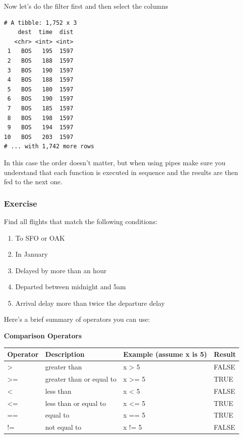 \documentclass[]{article}
\newenvironment{Shaded}{\begin{snugshade}}{\end{snugshade}}
\newcommand{\KeywordTok}[1]{\textcolor[rgb]{0.13,0.29,0.53}{\textbf{{#1}}}}
\newcommand{\StringTok}[1]{\textcolor[rgb]{0.31,0.60,0.02}{{#1}}}
\newcommand{\NormalTok}[1]{{#1}}
\providecommand{\tightlist}{%
  \setlength{\itemsep}{0pt}\setlength{\parskip}{0pt}}
\theoremstyle{definition}
\theoremstyle{definition}
\theoremstyle{definition}
\theoremstyle{remark}
\begin{document}
Now let's do the filter first and then select the columns

\begin{Shaded}
\end{Shaded}

\begin{verbatim}
# A tibble: 1,752 x 3
    dest  time  dist
   <chr> <int> <int>
 1   BOS   195  1597
 2   BOS   188  1597
 3   BOS   190  1597
 4   BOS   188  1597
 5   BOS   180  1597
 6   BOS   190  1597
 7   BOS   185  1597
 8   BOS   198  1597
 9   BOS   194  1597
10   BOS   203  1597
# ... with 1,742 more rows
\end{verbatim}

In this case the order doesn't matter, but when using pipes make sure
you understand that each function is executed in sequence and the
results are then fed to the next one.

\subsubsection{Exercise}\label{exercise}

Find all flights that match the following conditions:

\begin{enumerate}
\def\labelenumi{\arabic{enumi}.}
\tightlist
\item
  To SFO or OAK
\item
  In January
\item
  Delayed by more than an hour
\item
  Departed between midnight and 5am
\item
  Arrival delay more than twice the departure delay
\end{enumerate}

Here's a brief summary of operators you can use:

\textbf{Comparison Operators}

\begin{tabular}{l|l|l|l}
\hline
Operator & Description & Example (assume x is 5) & Result\\
\hline
> & greater than & x > 5 & FALSE\\
\hline
>= & greater than or equal to & x >= 5 & TRUE\\
\hline
< & less than & x < 5 & FALSE\\
\hline
<= & less than or equal to & x <= 5 & TRUE\\
\hline
== & equal to & x == 5 & TRUE\\
\hline
!= & not equal to & x != 5 & FALSE\\
\hline
\end{tabular}
\end{document}
